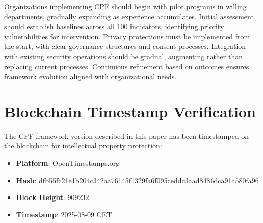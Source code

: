 \documentclass[11pt,a4paper]{article}
\begin{document}
Organizations implementing CPF should begin with pilot programs in willing departments, gradually expanding as experience accumulates. Initial assessment should establish baselines across all 100 indicators, identifying priority vulnerabilities for intervention. Privacy protections must be implemented from the start, with clear governance structures and consent processes. Integration with existing security operations should be gradual, augmenting rather than replacing current processes. Continuous refinement based on outcomes ensures framework evolution aligned with organizational needs.

\section{Blockchain Timestamp Verification}
\label{app:blockchain}

The CPF framework version described in this paper has been timestamped on the blockchain for intellectual property protection:

\begin{itemize}
\item \textbf{Platform}: OpenTimestamps.org
\item \textbf{Hash}: dfb55fc21e1b204c342aa76145f1329fa6f095ceddc3aad8486dca91a580fa96
\item \textbf{Block Height}: 909232
\item \textbf{Timestamp}: 2025-08-09 CET
\end{itemize}
\end{document}
